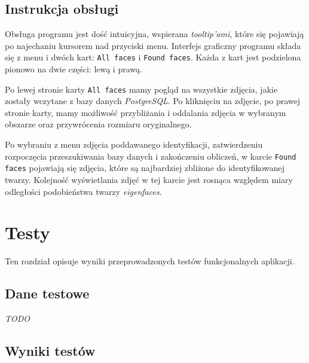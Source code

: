 \documentclass[a4paper,titlepage]{article}
\theoremstyle{break}
\numberwithin{equation}{subsection}
\begin{document}

\subsection{Instrukcja obsługi}

Obsługa programu jest dość intuicyjna, wspierana \emph{tooltip'ami}, które się pojawiają po najechaniu kursorem nad przyciski menu. Interfejs graficzny programu składa się z menu i dwóch kart: \texttt{All faces} i \texttt{Found faces}. Każda z  kart jest podzielona pionowo na dwie części: lewą i prawą.

Po lewej stronie karty \texttt{All faces} mamy pogląd na wszystkie zdjęcia, jakie zostały wczytane z bazy danych \emph{PostgreSQL}. Po kliknięciu na zdjęcie, po prawej stronie karty, mamy możliwość przybliżania i oddalania zdjęcia w wybranym obszarze oraz przywrócenia rozmiaru oryginalnego.

Po wybraniu z menu zdjęcia poddawanego identyfikacji, zatwierdzeniu rozpoczęcia przeszukiwania bazy danych i zakończeniu obliczeń, w karcie \texttt{Found faces} pojawiają się zdjęcia, które są najbardziej zbliżone do identyfikowanej twarzy. Kolejność wyświetlania zdjęć w tej karcie jest rosnąca względem miary odległości podobieństwa twarzy \emph{eigenfaces}.


\section{Testy}
\label{sec:testy}

Ten rozdział opisuje wyniki przeprowadzonych testów funkcjonalnych aplikacji.


\subsection{Dane testowe}

\emph{TODO}


\subsection{Wyniki testów}
\end{document}
